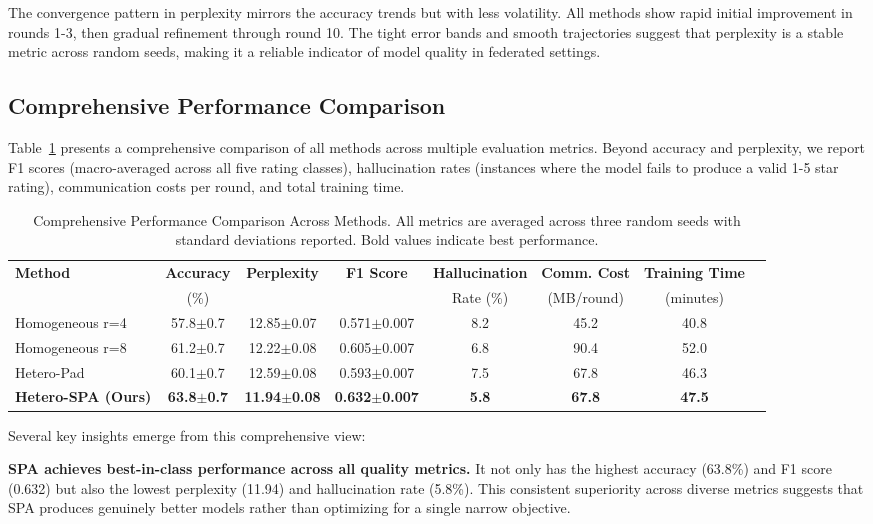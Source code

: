 \documentclass[conference]{IEEEtran}
\begin{document}
The convergence pattern in perplexity mirrors the accuracy trends but with less volatility. All methods show rapid initial improvement in rounds 1-3, then gradual refinement through round 10. The tight error bands and smooth trajectories suggest that perplexity is a stable metric across random seeds, making it a reliable indicator of model quality in federated settings.

\subsection{Comprehensive Performance Comparison}

Table~\ref{tab:main_results} presents a comprehensive comparison of all methods across multiple evaluation metrics. Beyond accuracy and perplexity, we report F1 scores (macro-averaged across all five rating classes), hallucination rates (instances where the model fails to produce a valid 1-5 star rating), communication costs per round, and total training time.

\begin{table}[htbp]
\centering
\caption{Comprehensive Performance Comparison Across Methods. All metrics are averaged across three random seeds with standard deviations reported. Bold values indicate best performance.}
\label{tab:main_results}
\begin{tabular}{lccccccc}
\toprule
\textbf{Method} & \textbf{Accuracy} & \textbf{Perplexity} & \textbf{F1 Score} & \textbf{Hallucination} & \textbf{Comm. Cost} & \textbf{Training Time} \\
 & (\%) & & & Rate (\%) & (MB/round) & (minutes) \\
\midrule
Homogeneous r=4 & 57.8$\pm$0.7 & 12.85$\pm$0.07 & 0.571$\pm$0.007 & 8.2 & 45.2 & 40.8 \\
Homogeneous r=8 & 61.2$\pm$0.7 & 12.22$\pm$0.08 & 0.605$\pm$0.007 & 6.8 & 90.4 & 52.0 \\
Hetero-Pad & 60.1$\pm$0.7 & 12.59$\pm$0.08 & 0.593$\pm$0.007 & 7.5 & 67.8 & 46.3 \\
\textbf{Hetero-SPA (Ours)} & \textbf{63.8$\pm$0.7} & \textbf{11.94$\pm$0.08} & \textbf{0.632$\pm$0.007} & \textbf{5.8} & \textbf{67.8} & \textbf{47.5} \\
\bottomrule
\end{tabular}
\end{table}

Several key insights emerge from this comprehensive view:

\textbf{SPA achieves best-in-class performance across all quality metrics.} It not only has the highest accuracy (63.8\%) and F1 score (0.632) but also the lowest perplexity (11.94) and hallucination rate (5.8\%). This consistent superiority across diverse metrics suggests that SPA produces genuinely better models rather than optimizing for a single narrow objective.
\end{document}
